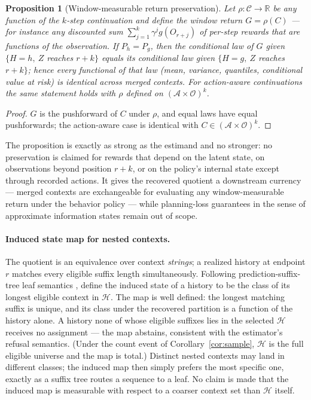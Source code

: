 \documentclass{article}
\newtheorem{proposition}[theorem]{Proposition}
\newcommand{\cA}{\mathcal A}
\newcommand{\cC}{\mathcal C}
\newcommand{\cH}{\mathcal H}
\newcommand{\cO}{\mathcal O}
\begin{document}
\begin{proposition}[Window-measurable return preservation]\label{prop:reward}
Let $\rho:\cC\to\mathbb R$ be any function of the $k$-step continuation and
define the window return $G=\rho(C)$ --- for instance any discounted sum
$\sum_{j=1}^{k}\gamma^{j}g(O_{r+j})$ of per-step rewards that are functions
of the observation.  If $P_h=P_g$, then the conditional law of $G$ given
$\{H=h,\ Z$ reaches $r+k\}$ equals its conditional law given
$\{H=g,\ Z$ reaches $r+k\}$; hence every functional of that law (mean,
variance, quantiles, conditional value at risk) is identical across merged
contexts.  For action-aware continuations the same statement holds with
$\rho$ defined on $(\cA\times\cO)^k$.
\end{proposition}
\begin{proof}
$G$ is the pushforward of $C$ under $\rho$, and equal laws have equal
pushforwards; the action-aware case is identical with
$C\in(\cA\times\cO)^k$.
\end{proof}

The proposition is exactly as strong as the estimand and no stronger: no
preservation is claimed for rewards that depend on the latent state, on
observations beyond position $r+k$, or on the policy's internal state
except through recorded actions.  It gives the recovered quotient a
downstream currency --- merged contexts are exchangeable for evaluating any
window-measurable return under the behavior policy --- while planning-loss
guarantees in the sense of approximate information states
\citep{subramanian2022approximate} remain out of scope.

\paragraph{Induced state map for nested contexts.}
The quotient is an equivalence over context \emph{strings}; a realized
history at endpoint $r$ matches every eligible suffix length
simultaneously.  Following prediction-suffix-tree leaf semantics
\citep{ron1996power}, define the induced state of a history to be the class
of its longest eligible context in $\cH$.  The map is well defined: the
longest matching suffix is unique, and its class under the recovered
partition is a function of the history alone.  A history none of whose
eligible suffixes lies in the selected $\cH$ receives no assignment ---
the map abstains, consistent with the estimator's refusal semantics.
(Under the count event of Corollary~\ref{cor:sample}, $\cH$ is the full
eligible universe and the map is total.)  Distinct nested contexts may
land in different classes; the induced map then simply prefers the most
specific one, exactly as a suffix tree routes a sequence to a leaf.  No
claim is made that the induced map is measurable with respect to a coarser
context set than $\cH$ itself.
\end{document}
